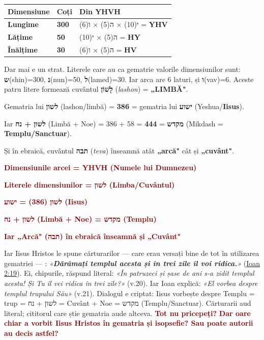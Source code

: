 \documentclass[12pt,a4paper,twoside,openany]{book}
\begin{document}
\begin{center}
\small
\begin{tabular}{L{3.9cm}L{1.6cm}L{9.4cm}}
\toprule
{}
\textbf{Dimensiune} & \textbf{Coți} & \textbf{Din YHVH} \\
\midrule
\textbf{Lungime} & \textbf{300} & י(10) × ה(5) × ו(6) = \textbf{YHV} \\
\textbf{Lățime} & \textbf{50} & ה(5) × י(10) = \textbf{HY} \\
\textbf{Înălțime} & \textbf{30} & ה(5) × ו(6) = \textbf{HV} \\
\bottomrule
\end{tabular}
\end{center}
\normalsize
Dar mai e un strat. Literele care au ca gematrie valorile dimensiunilor sunt: \textbf{ש}(shin)=300, \textbf{נ}(nun)=50, \textbf{ל}(lamed)=30. Iar arca are 6 laturi, și \textbf{ו}(vav)=6. Aceste patru litere formează cuvântul \textbf{לָשׁוֹן} (\textit{lashon}) = \textbf{„LIMBĂ"}.

Gematria lui \textbf{לשון} (lashon/limbă) = \textbf{386} = gematria lui \textbf{ישוע} (Yeshua/\textbf{Iisus}).

Iar \textbf{לשון + נח} (Limbă + Noe) = 386 + 58 = \textbf{444} = \textbf{מקדש} (Mikdash = \textbf{Templu/Sanctuar}).

Și în ebraică, cuvântul \textbf{תבה} (\textit{teva}) înseamnă atât \textbf{„arcă"} cât și \textbf{„cuvânt"}.

\textcolor{darkred}{\textbf{Dimensiunile arcei = YHVH (Numele lui Dumnezeu) \\}

\textbf{Literele dimensiunilor = לשון (Limba/Cuvântul) \\}

\textbf{לשון (386) = ישוע (Iisus) \\}

\textbf{לשון + נח (Limbă + Noe) = מקדש (Templu) \\}

\textbf{Iar „Arcă" (תבה) în ebraică înseamnă și „Cuvânt"}}

Iar Iisus Hristos le spune cărturarilor — care erau versați bine de tot în utilizarea gematriei — : \textit{«\textbf{Dărâmați templul acesta și în trei zile îl voi ridica.}»} (\href{https://bibliaortodoxa.ro/carte.php?id=35\&cap=2\#19}{Ioan 2:19}). Ei, chipurile, răspund literal: \textit{«În patruzeci și șase de ani s-a zidit templul acesta! Și Tu îl vei ridica în trei zile?»} (v.20). Iar Ioan explică: \textit{«El vorbea despre templul trupului Său»} (v.21). Dialogul e criptat: Iisus vorbește despre Templu = trup = לשון + נח = Cuvânt + Noe = מקדש (Templu/Sanctuar). Cărturarii aud literal; cititorul care știe gematria aude altceva. \textcolor{darkred}{\textbf{Tot nu pricepeți?}} \textcolor{darkred}{\textbf{Dar oare chiar a vorbit Iisus Hristos în gematria și isopsefie? Sau poate autorii au decis astfel?}}
\end{document}

